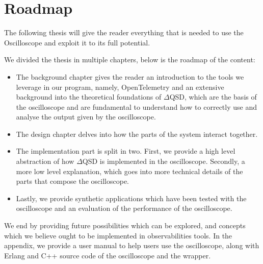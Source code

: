 \section{Roadmap}
    The following thesis will give the reader everything that is needed to use the Oscilloscope and exploit it to its full potential.

    We divided the thesis in multiple chapters, below is the roadmap of the content:
    \begin{itemize}
        \item The background chapter gives the reader an introduction to the tools we leverage in our program, namely, OpenTelemetry and an extensive background into the theoretical foundations of $\Delta$QSD, which are the basis of the oscilloscope and are fundamental to understand how to correctly use and analyse the output given by the oscilloscope.
        \item The design chapter delves into how the parts of the system interact together.
        \item The implementation part is split in two. First, we provide a high level abstraction of how $\Delta$QSD is implemented in the oscilloscope. Secondly, a more low level explanation, which goes into more technical details of the parts that compose the oscilloscope.
        \item Lastly, we provide synthetic applications which have been tested with the oscilloscope and an evaluation of the performance of the oscilloscope.

    \end{itemize}

    We end by providing future possibilities which can be explored, and concepts which we believe ought to be implemented in observabilities tools. 
    In the appendix, we provide a user manual to help users use the oscilloscope, along with Erlang and C++ source code of the oscilloscope and the wrapper.
